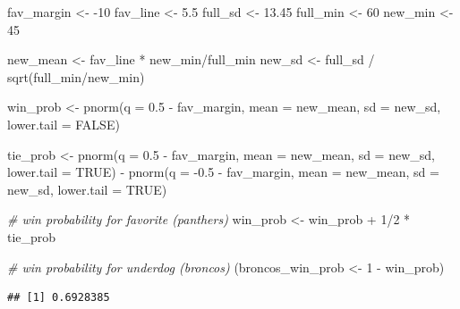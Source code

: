 \documentclass[
  11pt,
]{book}
\newenvironment{Shaded}{\begin{snugshade}}{\end{snugshade}}
\newcommand{\AttributeTok}[1]{\textcolor[rgb]{0.77,0.63,0.00}{#1}}
\newcommand{\CommentTok}[1]{\textcolor[rgb]{0.56,0.35,0.01}{\textit{#1}}}
\newcommand{\ConstantTok}[1]{\textcolor[rgb]{0.00,0.00,0.00}{#1}}
\newcommand{\DecValTok}[1]{\textcolor[rgb]{0.00,0.00,0.81}{#1}}
\newcommand{\FloatTok}[1]{\textcolor[rgb]{0.00,0.00,0.81}{#1}}
\newcommand{\FunctionTok}[1]{\textcolor[rgb]{0.00,0.00,0.00}{#1}}
\newcommand{\NormalTok}[1]{#1}
\newcommand{\OtherTok}[1]{\textcolor[rgb]{0.56,0.35,0.01}{#1}}
\newcommand{\SpecialCharTok}[1]{\textcolor[rgb]{0.00,0.00,0.00}{#1}}
\theoremstyle{definition}
\theoremstyle{definition}
\theoremstyle{definition}
\theoremstyle{definition}
\theoremstyle{remark}
\begin{document}
\begin{Shaded}
\begin{Highlighting}[]
\NormalTok{fav\_margin }\OtherTok{\textless{}{-}} \SpecialCharTok{{-}}\DecValTok{10}
\NormalTok{fav\_line }\OtherTok{\textless{}{-}} \FloatTok{5.5}
\NormalTok{full\_sd }\OtherTok{\textless{}{-}} \FloatTok{13.45}
\NormalTok{full\_min }\OtherTok{\textless{}{-}} \DecValTok{60}
\NormalTok{new\_min }\OtherTok{\textless{}{-}} \DecValTok{45}

\NormalTok{new\_mean }\OtherTok{\textless{}{-}}\NormalTok{ fav\_line }\SpecialCharTok{*}\NormalTok{ new\_min}\SpecialCharTok{/}\NormalTok{full\_min}
\NormalTok{new\_sd }\OtherTok{\textless{}{-}}\NormalTok{ full\_sd }\SpecialCharTok{/} \FunctionTok{sqrt}\NormalTok{(full\_min}\SpecialCharTok{/}\NormalTok{new\_min)}

\NormalTok{win\_prob }\OtherTok{\textless{}{-}} \FunctionTok{pnorm}\NormalTok{(}\AttributeTok{q =} \FloatTok{0.5} \SpecialCharTok{{-}}\NormalTok{ fav\_margin, }\AttributeTok{mean =}\NormalTok{ new\_mean, }
                  \AttributeTok{sd =}\NormalTok{ new\_sd, }\AttributeTok{lower.tail =} \ConstantTok{FALSE}\NormalTok{)}

\NormalTok{tie\_prob }\OtherTok{\textless{}{-}} \FunctionTok{pnorm}\NormalTok{(}\AttributeTok{q =} \FloatTok{0.5} \SpecialCharTok{{-}}\NormalTok{ fav\_margin, }\AttributeTok{mean =}\NormalTok{ new\_mean, }
                  \AttributeTok{sd =}\NormalTok{ new\_sd, }\AttributeTok{lower.tail =} \ConstantTok{TRUE}\NormalTok{) }\SpecialCharTok{{-}}
            \FunctionTok{pnorm}\NormalTok{(}\AttributeTok{q =} \SpecialCharTok{{-}}\FloatTok{0.5} \SpecialCharTok{{-}}\NormalTok{ fav\_margin, }\AttributeTok{mean =}\NormalTok{ new\_mean, }
                  \AttributeTok{sd =}\NormalTok{ new\_sd, }\AttributeTok{lower.tail =} \ConstantTok{TRUE}\NormalTok{)}

\CommentTok{\# win probability for favorite (panthers)}
\NormalTok{win\_prob }\OtherTok{\textless{}{-}}\NormalTok{ win\_prob }\SpecialCharTok{+} \DecValTok{1}\SpecialCharTok{/}\DecValTok{2} \SpecialCharTok{*}\NormalTok{ tie\_prob}

\CommentTok{\# win probability for underdog (broncos)}
\NormalTok{(broncos\_win\_prob }\OtherTok{\textless{}{-}} \DecValTok{1} \SpecialCharTok{{-}}\NormalTok{ win\_prob)}
\end{Highlighting}
\end{Shaded}

\begin{verbatim}
## [1] 0.6928385
\end{verbatim}
\end{document}

